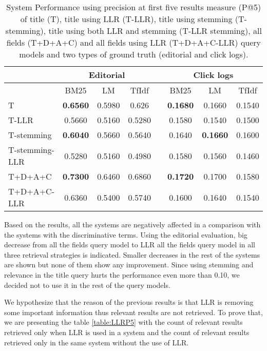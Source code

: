 \begin{table}[H]
\begin{center}
\caption{System Performance using precision at first five results measure (P@5) of title (T), title using LLR (T-LLR), title using stemming (T-stemming), title using both LLR and stemming (T-LLR stemming), all fields (T+D+A+C) and all fields using LLR (T+D+A+C-LLR) query models and two types of ground truth (editorial and click logs).}
\label{table:discP5}

\begin{tabular}{lccccccc}
\toprule
 & \multicolumn{3}{c}{Editorial} & & \multicolumn{3}{c}{Click logs} \\
\midrule
 & BM25 & LM & TfIdf &   & BM25 & LM & TfIdf \\
\midrule
T & \textbf{0.6560} &  0.5980 & 0.626 &   &      \textbf{0.1680} & 0.1660 & 0.1540 \\
T-LLR & 0.5660 & 0.5160 & 0.5280 &   &	 		 0.1580 & 0.1540 & 0.1500 \\
\midrule
T-stemming 	& \textbf{0.6040} & 0.5660 & 0.5640 &   &	 0.1640 & \textbf{0.1660} & 0.1600 \\
T-stemming-LLR & 0.5280 & 0.5160 & 0.4980 &   &	 0.1580 & 0.1560 & 0.1460 \\
\midrule
T+D+A+C & \textbf{0.7300} & 0.6460 & 0.6860 &   &		 \textbf{0.1720} & 0.1700 & 0.1580 \\
T+D+A+C-LLR & 0.6360 & 0.5400 & 0.5740 &   &	 0.1600 & 0.1640 & 0.1540 \\
\bottomrule
\end{tabular}
\end{center}
\end{table}


Based on the results, all the systems are negatively affected in a comparison with the systems with the discriminative terms. Using the editorial evaluation, big decrease from all the fields query model to LLR all the fields query model in all three retrieval strategies is indicated. Smaller decreases in the rest of the systems are shown but none of them show any improvement. Since using stemming and relevance in the title query hurts the performance even more than 0.10, we decided not to use it in the rest of the query models.


We hypothesize that the reason of the previous results is that LLR is removing some important information thus relevant results are not retrieved. To prove that, we are presenting the table \ref{table:LLRP5} with the count of relevant results retrieved only when LLR is used in a system and the count of relevant results retrieved only in the same system without the use of LLR.

